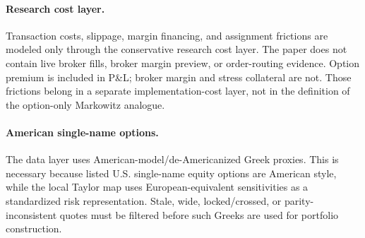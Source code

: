 \paragraph{Research cost layer.}
Transaction costs, slippage, margin financing, and assignment frictions are modeled only
through the conservative research cost layer. The paper does not contain live broker fills,
broker margin preview, or order-routing evidence. Option
premium is included in P\&L; broker margin and stress collateral are not.
Those frictions belong in a separate implementation-cost layer, not in
the definition of the option-only Markowitz analogue.

\paragraph{American single-name options.}
The data layer uses American-model/de-Americanized Greek proxies. This is
necessary because listed U.S. single-name equity options are American
style, while the local Taylor map uses European-equivalent sensitivities
as a standardized risk representation. Stale, wide, locked/crossed, or
parity-inconsistent quotes must be filtered before such Greeks are used
for portfolio construction.
